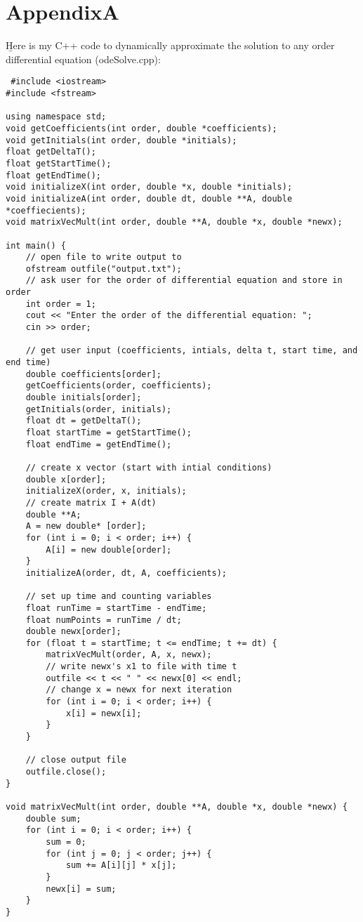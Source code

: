 \documentclass[10pt, AMS Euler]{article}
\begin{document}
\section*{AppendixA}
\b Here is my C++ code to dynamically approximate the solution to any order differential equation (odeSolve.cpp):
\begin{lstlisting}
 #include <iostream>
#include <fstream>

using namespace std;
void getCoefficients(int order, double *coefficients);
void getInitials(int order, double *initials);
float getDeltaT();
float getStartTime();
float getEndTime();
void initializeX(int order, double *x, double *initials);
void initializeA(int order, double dt, double **A, double *coeffiecients);
void matrixVecMult(int order, double **A, double *x, double *newx);

int main() {
    // open file to write output to
    ofstream outfile("output.txt");
    // ask user for the order of differential equation and store in order
    int order = 1;
    cout << "Enter the order of the differential equation: ";
    cin >> order;
    
    // get user input (coefficients, intials, delta t, start time, and end time)
    double coefficients[order];
    getCoefficients(order, coefficients);
    double initials[order];
    getInitials(order, initials);
    float dt = getDeltaT();
    float startTime = getStartTime();
    float endTime = getEndTime();

    // create x vector (start with intial conditions)
    double x[order];
    initializeX(order, x, initials);
    // create matrix I + A(dt)
    double **A;
    A = new double* [order];
    for (int i = 0; i < order; i++) {
        A[i] = new double[order];
    }
    initializeA(order, dt, A, coefficients);

    // set up time and counting variables
    float runTime = startTime - endTime;
    float numPoints = runTime / dt;
    double newx[order];
    for (float t = startTime; t <= endTime; t += dt) {
        matrixVecMult(order, A, x, newx);
        // write newx's x1 to file with time t
        outfile << t << " " << newx[0] << endl;
        // change x = newx for next iteration
        for (int i = 0; i < order; i++) {
            x[i] = newx[i];
        }
    }  

    // close output file 
    outfile.close();
}

void matrixVecMult(int order, double **A, double *x, double *newx) {
    double sum;
    for (int i = 0; i < order; i++) {
        sum = 0;
        for (int j = 0; j < order; j++) {
            sum += A[i][j] * x[j];
        }
        newx[i] = sum;
    }
}


\end{lstlisting}
\end{document}
